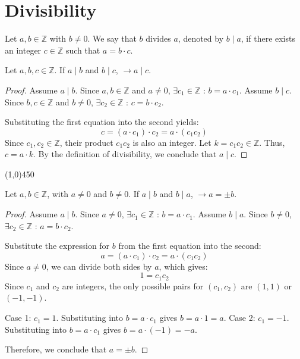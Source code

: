 \section{Divisibility}
\begin{definition}
Let $a, b \in \mathbb{Z}$ with $b \neq 0$. We say that $b$ divides $a$, denoted by $b \mid a$, if there exists an integer $c \in \mathbb{Z}$ such that $a = b \cdot c$.
\end{definition}

\bigskip

\begin{proposition}
    Let $a, b, c \in \mathbb{Z}$.
    If $a \mid b$ and $b \mid c$, $\rightarrow a \mid c$.
\end{proposition}

\begin{proof}
    Assume $a \mid b$. Since $a, b \in \mathbb{Z}$ and $a \neq 0$, $\exists c_1 \in \mathbb{Z}$ : $b = a \cdot c_1$.
    Assume $b \mid c$. Since $b, c \in \mathbb{Z}$ and $b \neq 0$, $\exists c_2 \in \mathbb{Z}$ : $c = b \cdot c_2$.
    
    Substituting the first equation into the second yields:
    $$c = (a \cdot c_1) \cdot c_2 = a \cdot (c_1 c_2)$$
    Since $c_1, c_2 \in \mathbb{Z}$, their product $c_1 c_2$ is also an integer. Let $k = c_1 c_2 \in \mathbb{Z}$.
    Thus, $c = a \cdot k$.
    By the definition of divisibility, we conclude that $a \mid c$.
\end{proof}

\begin{center}
    \vspace{10pt}
    \line(1,0){450}
    \vspace{25pt}
\end{center}

\begin{proposition}
    Let $a, b \in \mathbb{Z}$, with $a \neq 0$ and $b \neq 0$.
    If $a \mid b$ and $b \mid a$, $\rightarrow a = \pm b$.
\end{proposition}

\begin{proof}
    Assume $a \mid b$. Since $a \neq 0$, $\exists c_1 \in \mathbb{Z}$ : $b = a \cdot c_1$.
    Assume $b \mid a$. Since $b \neq 0$, $\exists c_2 \in \mathbb{Z}$ : $a = b \cdot c_2$.
    
    Substitute the expression for $b$ from the first equation into the second:
    $$a = (a \cdot c_1) \cdot c_2 = a \cdot (c_1 c_2)$$
    Since $a \neq 0$, we can divide both sides by $a$, which gives:
    $$1 = c_1 c_2$$
    Since $c_1$ and $c_2$ are integers, the only possible pairs for $(c_1, c_2)$ are $(1, 1)$ or $(-1, -1)$.
    
    Case 1: $c_1 = 1$. Substituting into $b = a \cdot c_1$ gives $b = a \cdot 1 = a$.
    Case 2: $c_1 = -1$. Substituting into $b = a \cdot c_1$ gives $b = a \cdot (-1) = -a$.
    
    Therefore, we conclude that $a = \pm b$.
\end{proof}

